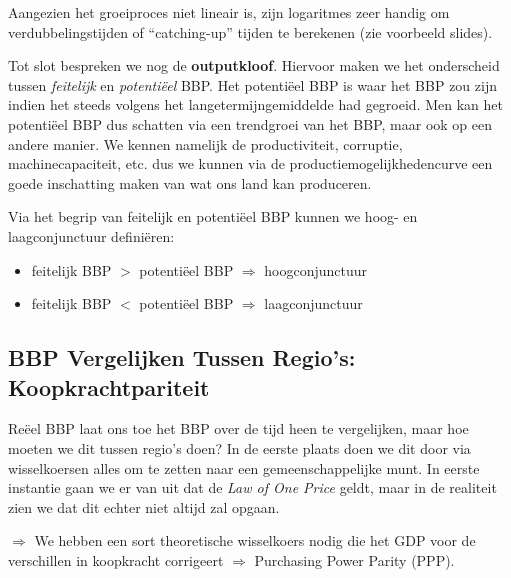 Aangezien het groeiproces niet lineair is, zijn logaritmes zeer handig om verdubbelingstijden of ``catching-up'' tijden te berekenen (zie voorbeeld slides).

Tot slot bespreken we nog de \textbf{outputkloof}. Hiervoor maken we het onderscheid tussen \textit{feitelijk} en \textit{potenti\"eel} BBP. Het potenti\"eel BBP is waar het BBP zou zijn indien het steeds volgens het langetermijngemiddelde had gegroeid. Men kan het potenti\"eel BBP dus schatten via een trendgroei van het BBP, maar ook op een andere manier. We kennen namelijk de productiviteit, corruptie, machinecapaciteit, etc. dus we kunnen via de productiemogelijkhedencurve een goede inschatting maken van wat ons land kan produceren.

Via het begrip van feitelijk en potenti\"eel BBP kunnen we hoog- en laagconjunctuur defini\"eren:
\begin{itemize}
    \item feitelijk BBP $>$ potenti\"eel BBP $\Rightarrow$ hoogconjunctuur
    \item feitelijk BBP $<$ potenti\"eel BBP $\Rightarrow$ laagconjunctuur
\end{itemize}

\subsection{BBP Vergelijken Tussen Regio's: Koopkrachtpariteit}
Re\"eel BBP laat ons toe het BBP over de tijd heen te vergelijken, maar hoe moeten we dit tussen regio's doen? In de eerste plaats doen we dit door via wisselkoersen alles om te zetten naar een gemeenschappelijke munt. In eerste instantie gaan we er van uit dat de \textit{Law of One Price} geldt, maar in de realiteit zien we dat dit echter niet altijd zal opgaan.

$\Rightarrow$ We hebben een sort theoretische wisselkoers nodig die het GDP voor de verschillen in koopkracht corrigeert $\Rightarrow$ Purchasing Power Parity (PPP).
